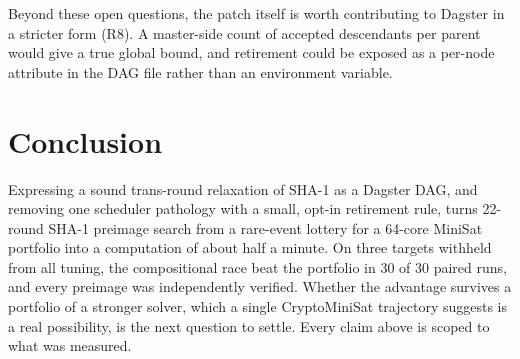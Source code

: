 \documentclass[11pt,a4paper]{article}
\begin{document}
Beyond these open questions, the patch itself is worth contributing to Dagster in a stricter form
(R8). A master-side count of accepted descendants per parent would give a true global bound, and
retirement could be exposed as a per-node attribute in the DAG file rather than an environment
variable.

\section{Conclusion}

Expressing a sound trans-round relaxation of SHA-1 as a Dagster DAG, and removing one scheduler
pathology with a small, opt-in retirement rule, turns 22-round SHA-1 preimage search from a rare-event
lottery for a 64-core MiniSat portfolio into a computation of about half a minute. On three targets
withheld from all tuning, the compositional race beat the portfolio in 30 of 30 paired runs, and every
preimage was independently verified. Whether the advantage survives a portfolio of a stronger solver,
which a single CryptoMiniSat trajectory suggests is a real possibility, is the next question to
settle. Every claim above is scoped to what was measured.
\appendix

\end{document}
